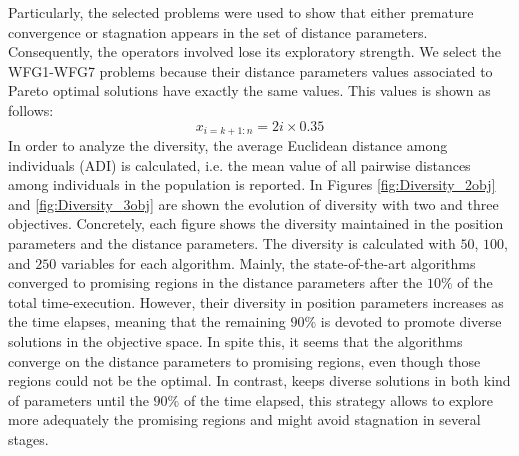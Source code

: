 %
Particularly, the selected problems were used to show that either premature convergence or stagnation appears in the set of distance parameters.
%
Consequently, the operators involved lose its exploratory strength.
%
We select the WFG1-WFG7 problems because their distance parameters values associated to Pareto optimal solutions have exactly the same values.
%
This values is shown as follows:
\begin{equation}
   x_{i=k+1:n} = 2i \times 0.35
\end{equation}
%
%
In order to analyze the diversity, the average Euclidean distance among individuals (ADI) is calculated, i.e. the mean value of all pairwise distances among individuals in the population is reported.
%
In Figures \ref{fig:Diversity_2obj} and \ref{fig:Diversity_3obj} are shown the evolution of diversity with two and three objectives.
%
Concretely, each figure shows the diversity maintained in the position parameters and the distance parameters.
%
The diversity is calculated with $50$, $100$, and $250$ variables for each algorithm.
%
Mainly, the state-of-the-art algorithms converged to promising regions in the distance parameters after the $10\%$ of the total time-execution.
%
However, their diversity in position parameters increases as the time elapses, meaning that the remaining $90\%$ is devoted to promote diverse solutions in the objective space.
%
In spite this, it seems that the algorithms converge on the distance parameters to promising regions, even though those regions could not be the optimal.
%
In contrast, \VSDMOEA{} keeps diverse solutions in both kind of parameters until the $90\%$ of the time elapsed, this strategy allows to explore more adequately the promising regions and might avoid stagnation in several stages.
%
